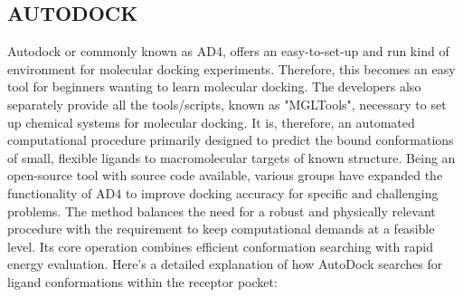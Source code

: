 \documentclass[11pt]{article}
\begin{document}
\subsection*{AUTODOCK}
Autodock or commonly known as AD4, offers an easy-to-set-up and run kind of environment for molecular docking experiments. Therefore, this becomes an easy tool for beginners wanting to learn molecular docking. The developers also separately provide all the tools/scripts, known as "MGLTools", necessary to set up chemical systems for molecular docking. It is, therefore, an automated computational procedure primarily designed to predict the bound conformations of small, flexible ligands to macromolecular targets of known structure. Being an open-source tool with source code available, various groups have expanded the functionality of AD4 to improve docking accuracy for specific and challenging problems. 
The method balances the need for a robust and physically relevant procedure with the requirement to keep computational demands at a feasible level. Its core operation combines efficient conformation searching with rapid energy evaluation.
Here's a detailed explanation of how AutoDock searches for ligand conformations within the receptor pocket:
\end{document}
